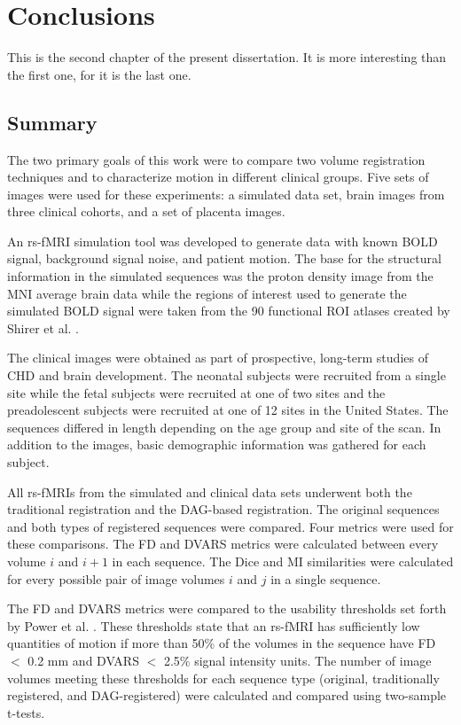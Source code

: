 \chapter{Conclusions}
\label{ch:fin}
This is the second chapter of the present dissertation. It is more interesting than the first one, for it is the last one.

\section{Summary}

The two primary goals of this work were to compare two volume registration techniques and to characterize motion in different clinical groups. Five sets of images were used for these experiments: a simulated data set, brain images from three clinical cohorts, and a set of placenta images. 

An rs-fMRI simulation tool was developed to generate data with known BOLD signal, background signal noise, and patient motion. The base for the structural information in the simulated sequences was the proton density image from the MNI average brain data while the regions of interest used to generate the simulated BOLD signal were taken from the 90 functional ROI atlases created by Shirer et al. \cite{Shirer2012}. 

The clinical images were obtained as part of prospective, long-term studies of CHD and brain development. The neonatal subjects were recruited from a single site while the fetal subjects were recruited at one of two sites and the preadolescent subjects were recruited at one of 12 sites in the United States. The sequences differed in length depending on the age group and site of the scan. In addition to the images, basic demographic information was gathered for each subject.

All rs-fMRIs from the simulated and clinical data sets underwent both the traditional registration and the DAG-based registration. The original sequences and both types of registered sequences were compared. Four metrics were used for these comparisons. The FD and DVARS metrics were calculated between every volume $i$ and $i+1$ in each sequence. The Dice and MI similarities were calculated for every possible pair of image volumes $i$ and $j$ in a single sequence. 

The FD and DVARS metrics were compared to the usability thresholds set forth by Power et al. \cite{Power2012}. These thresholds state that an rs-fMRI has sufficiently low quantities of motion if more than 50\% of the volumes in the sequence have FD $<$ 0.2 mm and DVARS $<$ 2.5\% signal intensity units. The number of image volumes meeting these thresholds for each sequence type (original, traditionally registered, and DAG-registered) were calculated and compared using two-sample t-tests. 

